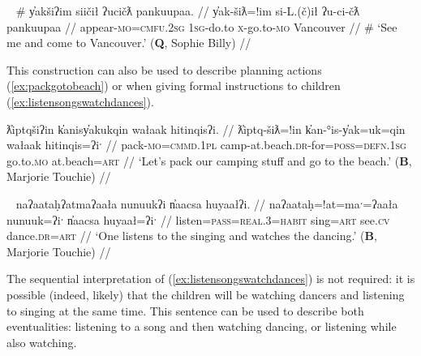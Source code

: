 \ex~ \label{ex:cometovancouver2}
\begingl
\glpreamble \# y̓akšiʔim siičił ʔucičƛ pankuupaa. //
\gla y̓ak-šiƛ=!im si-L.(č)ił ʔu-ci-čƛ pankuupaa //
\glb appear-\textsc{mo}=\textsc{cmfu.2sg} \textsc{1sg}-do.to \textsc{x}-go.to-\textsc{mo} Vancouver //
\glft \# `See me and come to Vancouver.' (\textbf{Q}, Sophie Billy) //
\endgl
\xe

This construction can also be used to describe planning actions (\ref{ex:packgotobeach}) or when giving formal instructions to children (\ref{ex:listensongswatchdances}).%

\ex \label{ex:packgotobeach}
\begingl
\glpreamble ƛ̓iptqšiʔin k̓anisy̓akukqin wałaak hitinqisʔi. //
\gla ƛ̓iptq-šiƛ=!in k̓an-°is-y̓ak=uk=qin wałaak hitinqis=ʔiˑ //
\glb pack-\textsc{mo}=\textsc{cmmd.1pl} camp-at.beach.\textsc{dr}-for=\textsc{poss}=\textsc{defn.1sg} go.to.\textsc{mo} at.beach=\textsc{art} //
\glft `Let's pack our camping stuff and go to the beach.' (\textbf{B}, Marjorie Touchie) //
\endgl
\xe

\ex~ \label{ex:listensongswatchdances}
\begingl
\glpreamble naʔaataḥʔatmaʔaała nunuukʔi n̓aacsa huyaałʔi. //
\gla naʔaataḥ=!at=maˑ=ʔaała nunuuk=ʔiˑ n̓aacsa huyaał=ʔiˑ //
\glb listen=\textsc{pass}=\textsc{real.3}=\textsc{habit} sing=\textsc{art} see.\textsc{cv} dance.\textsc{dr}=\textsc{art} //
\glft `One listens to the singing and watches the dancing.' (\textbf{B}, Marjorie Touchie) //
\endgl
\xe

The sequential interpretation of (\ref{ex:listensongswatchdances}) is not required: it is possible (indeed, likely) that the children will be watching dancers and listening to singing at the same time. This sentence can be used to describe both eventualities: listening to a song and then watching dancing, or listening while also watching.

\begin{comment}
It is possible for both verbs in this kind of SVC to share a single direct object. [[Comment: Below be recategorized as Type I?]]

recast the below

\ex \label{ex:listenrespect}
\begingl
\glpreamble naʔaataḥʔaqƛ̓iʔaał ʔiisaak ʔuukʷił ʔaʔiič̓um. //
\gla naʔaataḥ=!aqƛ=!iˑ=ʔaał ʔiisaak ʔu-L.(č)ił ʔaʔiič̓um //
\glb listen.\textsc{dr}=\textsc{fut}=\textsc{cmmd.2sg}=\textsc{habit} respect.\textsc{dr} \textsc{x}-do.to elder.\textsc{pl} //
\glft `Listen to and respect the elders.' (\textbf{C}, \textit{tupaat} Julia Lucas) //
\endgl
\xe


\end{comment}

